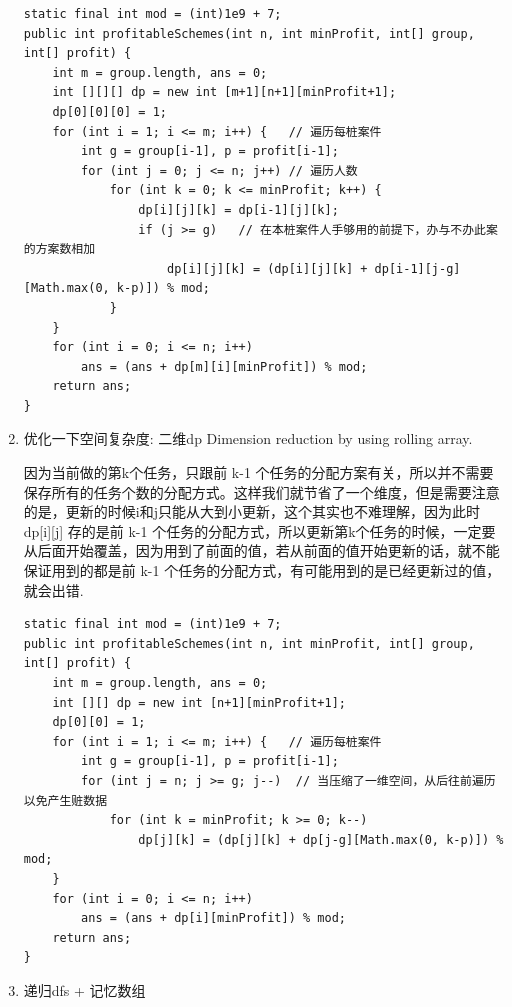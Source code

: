 \documentclass[9pt, b5paaper]{book}
\begin{document}
\begin{enumerate}
\begin{verbatim}
static final int mod = (int)1e9 + 7;
public int profitableSchemes(int n, int minProfit, int[] group, int[] profit) {
    int m = group.length, ans = 0;
    int [][][] dp = new int [m+1][n+1][minProfit+1];
    dp[0][0][0] = 1;
    for (int i = 1; i <= m; i++) {   // 遍历每桩案件
        int g = group[i-1], p = profit[i-1];
        for (int j = 0; j <= n; j++) // 遍历人数
            for (int k = 0; k <= minProfit; k++) {
                dp[i][j][k] = dp[i-1][j][k];
                if (j >= g)   // 在本桩案件人手够用的前提下，办与不办此案的方案数相加
                    dp[i][j][k] = (dp[i][j][k] + dp[i-1][j-g][Math.max(0, k-p)]) % mod;
            }
    }
    for (int i = 0; i <= n; i++) 
        ans = (ans + dp[m][i][minProfit]) % mod;
    return ans;
}
\end{verbatim}
\item 优化一下空间复杂度: 二维dp Dimension reduction by using rolling array.
\label{sec-1-4-27-1}

因为当前做的第k个任务，只跟前 k-1 个任务的分配方案有关，所以并不需要保存所有的任务个数的分配方式。这样我们就节省了一个维度，但是需要注意的是，更新的时候i和j只能从大到小更新，这个其实也不难理解，因为此时 dp[i][j] 存的是前 k-1 个任务的分配方式，所以更新第k个任务的时候，一定要从后面开始覆盖，因为用到了前面的值，若从前面的值开始更新的话，就不能保证用到的都是前 k-1 个任务的分配方式，有可能用到的是已经更新过的值，就会出错.
\begin{verbatim}
static final int mod = (int)1e9 + 7;
public int profitableSchemes(int n, int minProfit, int[] group, int[] profit) {
    int m = group.length, ans = 0;
    int [][] dp = new int [n+1][minProfit+1];
    dp[0][0] = 1;
    for (int i = 1; i <= m; i++) {   // 遍历每桩案件
        int g = group[i-1], p = profit[i-1];
        for (int j = n; j >= g; j--)  // 当压缩了一维空间，从后往前遍历以免产生赃数据
            for (int k = minProfit; k >= 0; k--) 
                dp[j][k] = (dp[j][k] + dp[j-g][Math.max(0, k-p)]) % mod;
    }
    for (int i = 0; i <= n; i++) 
        ans = (ans + dp[i][minProfit]) % mod;
    return ans;
}
\end{verbatim}
\item 递归dfs + 记忆数组
\label{sec-1-4-27-2}


\end{enumerate}
\end{document}

